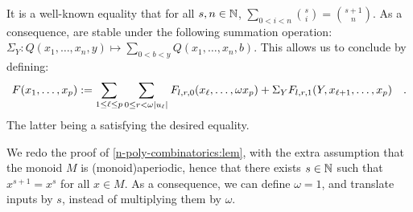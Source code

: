 \begin{proofof}
	It is a well-known equality that for all $s,n \in \mathbb{N}$,
	$\sum_{0 < i < n} \binom{s}{i} = \binom{s+1}{n}$.
	As a consequence,  are
	stable under the following summation operation:
	$\Sigma_Y \colon Q(x_1,\dots,x_n,y) \mapsto \sum_{0 < b < y} Q(x_1, \dots, x_n, b)$.
	This allows us to conclude by defining:
	\begin{equation*}
		F(x_1, \dots, x_p) \defined
		\sum_{1 \leq \ell \leq p} \sum_{0 \leq r < \omega \card{u_\ell}}
		F_{l,r,0}(x_{\ell}, \dots, \omega x_p) + \Sigma_Y F_{l,r,1}(Y,
		x_{\ell+1}, \dots, x_p)
		\quad .
	\end{equation*}
	The latter being a  satisfying
	the desired equality.
\end{proofof}

\begin{proofof}
	We redo the proof of \cref{n-poly-combinatorics:lem}, with the extra
	assumption that the monoid $M$ is \kl(monoid){aperiodic}, hence that there
	exists $s \in \mathbb{N}$ such that $x^{s+1} = x^s$ for all $x \in M$. As a
	consequence, we can define $\omega = 1$, and
	translate inputs by $s$, instead of multiplying them by $\omega$.
\end{proofof}

